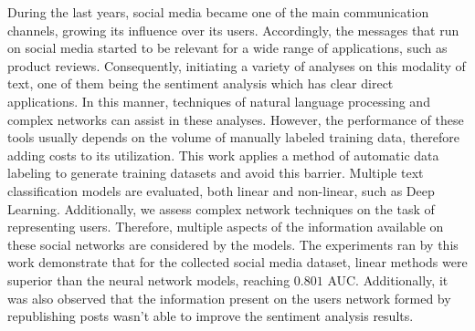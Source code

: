 \begin{foreignabstract}

During the last years, social media became one of the main communication channels, growing its influence over its users.
Accordingly, the messages that run on social media started to be relevant for a wide range of applications, such as product reviews.
Consequently, initiating a variety of analyses on this modality of text, one of them being the sentiment analysis which has clear direct applications.
In this manner, techniques of natural language processing and complex networks can assist in these analyses.
However, the performance of these tools usually depends on the volume of manually labeled training data, therefore adding costs to its utilization.
This work applies a method of automatic data labeling to generate training datasets and avoid this barrier.
Multiple text classification models are evaluated, both linear and non-linear, such as Deep Learning.
Additionally, we assess complex network techniques on the task of representing users.
Therefore, multiple aspects of the information available on these social networks are considered by the models.
The experiments ran by this work demonstrate that for the collected social media dataset,
linear methods were superior than the neural network models, reaching $0.801$ AUC.
Additionally, it was also observed that the information present on the users network formed by republishing posts wasn't able to improve the sentiment analysis results.

\end{foreignabstract}

